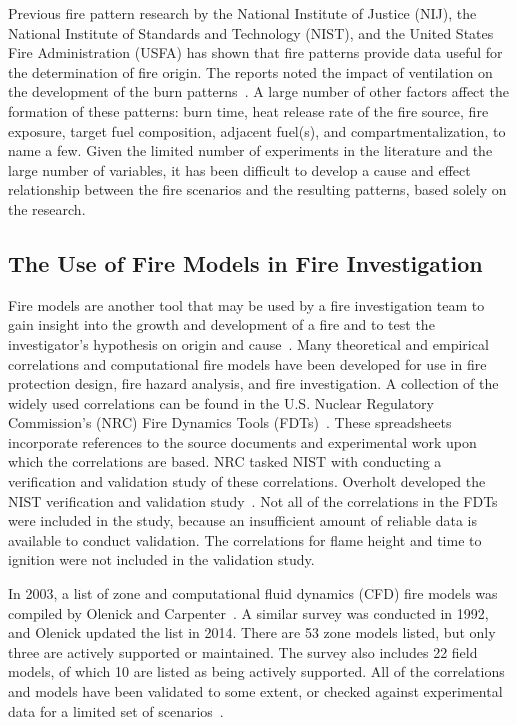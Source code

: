 \documentclass[twoside]{uocthesis}
\begin{document}
Previous fire pattern research by the National Institute of Justice (NIJ), the National Institute of Standards and Technology (NIST), and the United States Fire Administration (USFA) has shown that fire patterns provide data useful for the determination of fire origin.  The reports noted the impact of ventilation on the development of the burn patterns~\cite{Shanley:1997,Putorti:1997}. A large number of other factors affect the formation of these patterns: burn time, heat release rate of the fire source, fire exposure, target fuel composition, adjacent fuel(s), and compartmentalization, to name a few. Given the limited number of experiments in the literature and the large number of variables, it has been difficult to develop a cause and effect relationship between the fire scenarios and the resulting patterns, based solely on the research.  


\subsection{The Use of Fire Models in Fire Investigation}
Fire models are another tool that may be used by a fire investigation team to gain insight into the growth and development of a fire and to test the investigator’s hypothesis on origin and cause~\cite{Sutula:2001}.  Many theoretical and empirical correlations and computational fire models have been developed for use in fire protection design, fire hazard analysis, and fire investigation.  A collection of the widely used correlations can be found in the U.S. Nuclear Regulatory Commission’s (NRC) Fire Dynamics Tools (FDTs)~\cite{NUREG_1805}. These spreadsheets incorporate references to the source documents and experimental work upon which the correlations are based. NRC tasked NIST with conducting a verification and validation study of these correlations. Overholt developed the NIST verification and validation study~\cite{Overholt:2014}. Not all of the correlations in the FDTs were included in the study, because an insufficient amount of reliable data is available to conduct validation.  The correlations for flame height and time to ignition were not included in the validation study.

In 2003, a list of zone and computational fluid dynamics (CFD) fire models was compiled by Olenick and Carpenter~\cite{Olenick:2003}. A similar survey was conducted in 1992, and Olenick updated the list in 2014. There are 53 zone models listed, but only three are actively supported or maintained.  The survey also includes 22 field models, of which 10 are listed as being actively supported.  All of the correlations and models have been validated to some extent, or checked against experimental data for a limited set of scenarios~\cite{ASTM_E1355}.
\end{document}
